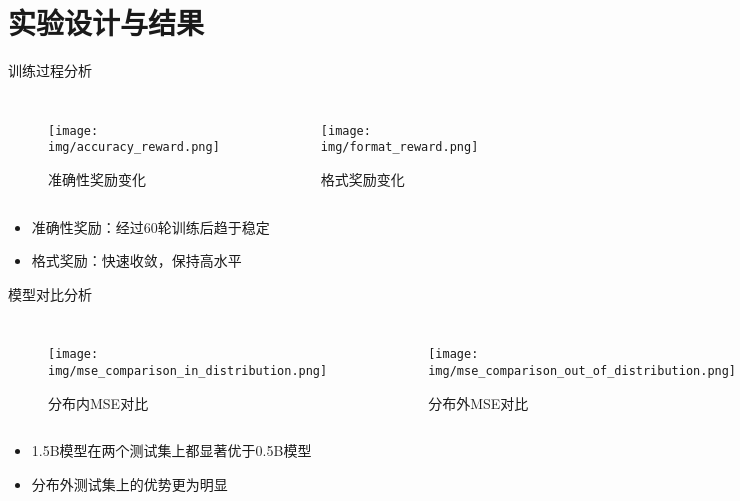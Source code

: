 \section{实验设计与结果}

\begin{frame}{训练过程分析}
    \begin{columns}
        \begin{figure}
            \texttt{[image: img/accuracy\_reward.png]}
            \caption{准确性奖励变化}
        \end{figure}
        \begin{figure}
            \texttt{[image: img/format\_reward.png]}
            \caption{格式奖励变化}
        \end{figure}
    \end{columns}
    \begin{itemize}
        \item 准确性奖励：经过60轮训练后趋于稳定
        \item 格式奖励：快速收敛，保持高水平
    \end{itemize}
\end{frame}

\begin{frame}{模型对比分析}
    \begin{columns}
        \begin{figure}
            \texttt{[image: img/mse\_comparison\_in\_distribution.png]}
            \caption{分布内MSE对比}
        \end{figure}
        \begin{figure}
            \texttt{[image: img/mse\_comparison\_out\_of\_distribution.png]}
            \caption{分布外MSE对比}
        \end{figure}
    \end{columns}
    \begin{itemize}
        \item 1.5B模型在两个测试集上都显著优于0.5B模型
        \item 分布外测试集上的优势更为明显
    \end{itemize}
\end{frame}

